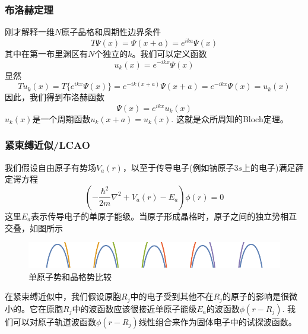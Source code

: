 \documentclass{article}
\numberwithin{equation}{subsection}
\begin{document}
\subsubsection*{布洛赫定理}
刚才解释一维$N$原子晶格和周期性边界条件
\begin{equation}
    T\Psi(x)=\Psi(x+a)=e^{ika}\Psi(x)
\end{equation}
其中在第一布里渊区有$N$个独立的$k$。我们可以定义函数
\begin{equation}
    u_k(x)=e^{-ikx}\Psi(x)
\end{equation}
显然
\begin{equation}
    Tu_k(x)=T\{e^{ikx}\Psi(x)\}=e^{-ik(x+a)}\Psi(x+a)=e^{-ikx}\Psi(x)=u_k(x)
\end{equation}
因此，我们得到布洛赫函数
\begin{equation}
    \Psi(x)=e^{ikx}u_k(x)
\end{equation}
$u_k(x)$是一个周期函数$u_k(x+a)=u_k(x)$. 这就是众所周知的Bloch定理。
\subsubsection*{紧束缚近似/LCAO}
我们假设自由原子有势场$V_a(r)$，以至于传导电子(例如钠原子$3s$上的电子)满足薛定谔方程
\begin{equation}
    \left(-\frac{\hbar^{2}}{2 m} \nabla^{2}+V_{a}(r)-E_{a}\right) \phi(r)=0
\end{equation}
这里$E_a$表示传导电子的单原子能级。当原子形成晶格时，原子之间的独立势相互交叠，如图所示
\begin{figure}[h]
    \centering
    \includegraphics[width=6in]{dirac6.pdf}
    \caption{\footnotesize{单原子势和晶格势比较}}\label{dirac pic 6}
\end{figure}
在紧束缚近似中，我们假设原胞$R_j$中的电子受到其他不在$R_j$的原子的影响是很微小的。它在原胞$R_j$中的波函数应该很接近单原子能级$E_a$的波函数$\phi(r-R_j)$. 我们可以对原子轨道波函数$\phi(r-R_j)$线性组合来作为固体电子中的试探波函数。
\end{document}

